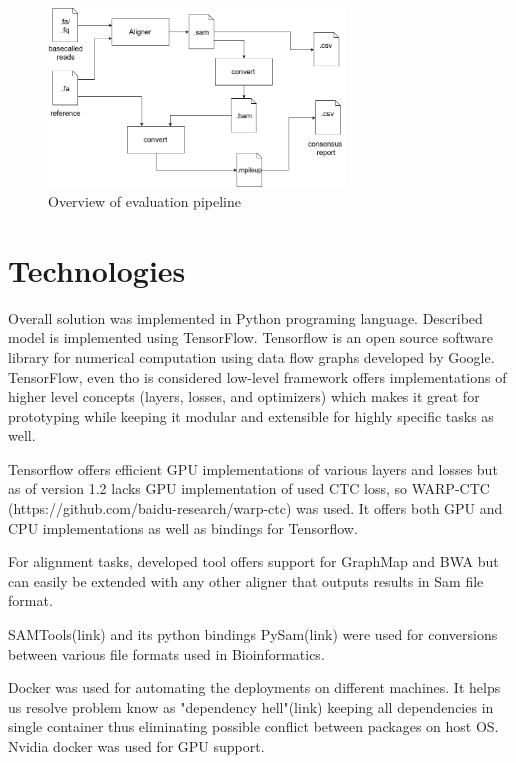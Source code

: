 \documentclass[times, utf8, diplomski, english]{fer}
\begin{document}
\begin{figure}[!ht]
	\begin{center}
		\includegraphics[width=0.7\textwidth]{./imgs/evaluation_pipeline.png}
		\caption{Overview of evaluation pipeline}
		\label{fg:eval_pipe}
	\end{center}
\end{figure}

\section{Technologies}

Overall solution was implemented in Python programing language. Described model is implemented using TensorFlow. Tensorflow is an open source software library for numerical computation using data flow graphs developed by Google.  TensorFlow, even tho is considered low-level framework offers implementations of higher level concepts (layers, losses, and optimizers) which makes it great for prototyping while keeping it modular and extensible for highly specific tasks as well.

Tensorflow offers efficient GPU implementations of various layers and losses but as of version 1.2 lacks GPU implementation of used CTC loss, so WARP-CTC (https://github.com/baidu-research/warp-ctc) was used. It offers both GPU and CPU implementations as well as bindings for Tensorflow.

For alignment tasks, developed tool offers support for GraphMap and BWA but can easily be extended with any other aligner that outputs results in Sam file format.

SAMTools(link) and its python bindings PySam(link) were used for conversions between various file formats used in Bioinformatics.

Docker was used for automating the deployments on different machines. It helps us resolve problem know as  "dependency hell"(link)  keeping all dependencies in single container thus eliminating possible conflict between packages on host OS.
Nvidia docker was used for GPU support.
\end{document}

